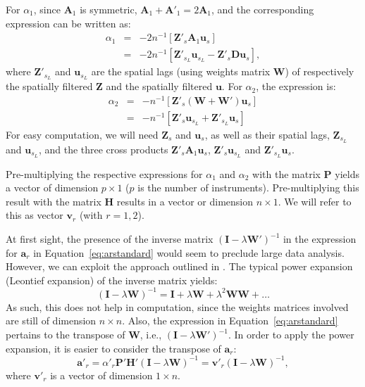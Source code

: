 \documentclass{article}
\begin{document}
For $\alpha_1$, since $\mathbf{A}_1$ is symmetric, $\mathbf{A}_1 + \mathbf{A'}_1 = 2 \mathbf{A}_1$, and the corresponding expression can be written as:
\begin{eqnarray*}
\alpha_1 &=& - 2 n^{-1} [ \mathbf{Z'}_s \mathbf{A}_1 \mathbf{u}_s ]\\
    &=& -2 n^{-1} [ \mathbf{Z'}_{s_L} \mathbf{u}_{s_L} - \mathbf{Z'}_s \mathbf{D} \mathbf{u}_s ],
\end{eqnarray*}
where $\mathbf{Z'}_{s_L}$ and $\mathbf{u}_{s_L}$ are the spatial lags (using weights
matrix $\mathbf{W}$) of respectively the spatially filtered $\mathbf{Z}$ and the spatially
filtered $\mathbf{u}$. For $\alpha_2$, the expression is:
\begin{eqnarray*}
 \alpha_2 &=& - n^{-1} [ \mathbf{Z'}_s (\mathbf{W} + \mathbf{W'} ) \mathbf{u}_s ] \\
    &=& - n^{-1} [ \mathbf{Z'}_s \mathbf{u}_{s_L} + \mathbf{Z'}_{s_L} \mathbf{u}_s ]
\end{eqnarray*}
For easy computation, we will need $\mathbf{Z}_s$ and $\mathbf{u}_s$, as well as their
spatial lags, $\mathbf{Z}_{s_L}$ and $\mathbf{u}_{s_L}$, and the three cross products
$ \mathbf{Z'}_s \mathbf{A}_1 \mathbf{u}_s$, $\mathbf{Z'}_s \mathbf{u}_{s_L} $
and $\mathbf{Z'}_{s_L} \mathbf{u}_s$.

Pre-multiplying the respective expressions for $\alpha_1$ and $\alpha_2$ with the
matrix $\mathbf{P}$ yields a vector of dimension $p \times 1$ ($p$ is the number of
instruments). Pre-multiplying this result with the matrix $\mathbf{H}$ results in a 
vector or dimension $n \times 1$. We will refer to this as vector $\mathbf{v}_r$ (with
$r = 1,2$).


At first sight, the presence of the inverse matrix $( \mathbf{I} - \lambda \mathbf{W'})^{-1}$ in the expression for $\mathbf{a}_r$ in Equation~\ref{eq:arstandard} would seem to preclude large data
analysis. However, we can exploit the approach outlined in \cite{Smirnov:05}. The typical
power expansion (Leontief expansion) of the inverse matrix yields:
\begin{equation*}
 ( \mathbf{I} - \lambda \mathbf{W})^{-1} = \mathbf{I} + \lambda \mathbf{W} + \lambda^2 \mathbf{WW} + \dots
\end{equation*}
As such, this does not help in computation, since the weights matrices involved are still
of dimension $n \times n$. Also, the expression in Equation~\ref{eq:arstandard} pertains to
the transpose of $\mathbf{W}$, i.e., $( \mathbf{I} - \lambda \mathbf{W'} )^{-1}$. In order
to apply the power expansion, it is easier to consider the transpose of $\mathbf{a}_r$:
\begin{equation}
\mathbf{a'}_r = \alpha'_r \mathbf{P'} \mathbf{H'} (\mathbf{I} - \lambda \mathbf{W} )^{-1} = \mathbf{v'}_r (\mathbf{I} - \lambda \mathbf{W} )^{-1},
\end{equation}
where $\mathbf{v'}_r$ is a vector of dimension $1 \times n$.
\end{document}
